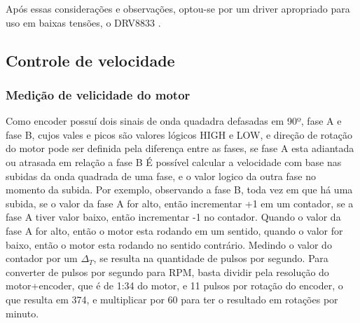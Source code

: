 Após essas considerações e observações, optou-se por um driver apropriado para uso em baixas tensões, o DRV8833
\cite{datasheel_dvr8833}.


\subsection{Controle de velocidade}

\subsubsection{Medição de velicidade do motor}

Como encoder possuí dois sinais de onda quadadra defasadas em 90º, fase A e fase B, cujos vales e picos são valores lógicos HIGH e LOW, 
e direção de rotação do motor pode ser definida pela diferença entre as fases, se fase A esta adiantada ou atrasada em relação a fase B
É possível calcular a velocidade com base nas subidas da onda quadrada de uma fase, e o valor logico da outra fase no momento da subida.
Por exemplo,  observando a fase B, toda vez em que há uma subida, se o valor da fase A for alto, então incrementar +1 em um contador, se a fase A tiver valor baixo, então incrementar -1 no contador.
Quando o valor da fase A for alto, então o motor esta rodando em um sentido,  quando o valor  for baixo, então o motor esta rodando no sentido contrário.
Medindo o valor do contador por um $\Delta_{T}$, se resulta na quantidade de pulsos por segundo.
Para converter de pulsos por segundo para RPM, basta dividir pela resolução do motor+encoder,  que é de 1:34 do motor, e 11 pulsos por rotação do encoder, o que resulta em 374,
e multiplicar por 60 para ter o resultado em rotações por minuto.




